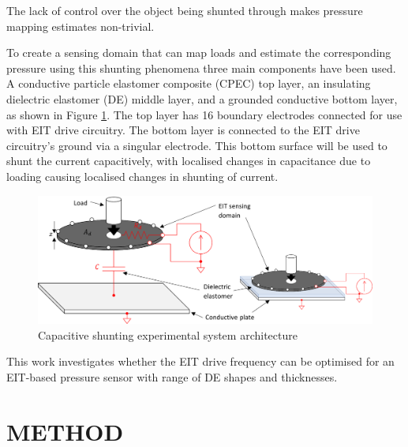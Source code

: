 The lack of control over the object being shunted through makes pressure mapping estimates non-trivial.

To create a sensing domain that can map loads and estimate the corresponding pressure using this shunting phenomena three main components have been used. A conductive particle elastomer composite (CPEC) top layer, an insulating dielectric elastomer (DE) middle layer, and a grounded conductive bottom layer, as shown in Figure \ref{fig:DE-EIT_cap_shunt}. The top layer has 16 boundary electrodes connected for use with EIT drive circuitry. The bottom layer is connected to the EIT drive circuitry's ground via a singular electrode. This bottom surface will be used to shunt the current capacitively, with localised changes in capacitance due to loading causing localised changes in shunting of current.

\begin{figure}[H]
	\centering
	\includegraphics[width=0.9\linewidth]{Figures/cap-shunt-draft.png} %
	\vspace{0.3cm}
	\caption{Capacitive shunting experimental system architecture}
	\label{fig:DE-EIT_cap_shunt}
\end{figure}


This work investigates whether the EIT drive frequency can be optimised for an EIT-based pressure sensor with range of DE shapes and thicknesses.


\section{METHOD}

